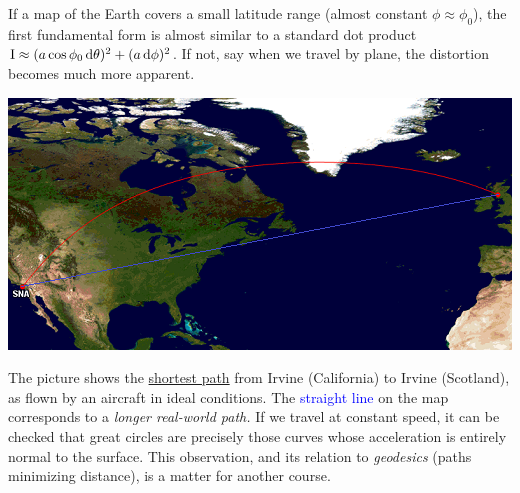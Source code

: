 \goodbreak


If a map of the Earth covers a small latitude range (almost constant $\phi\approx\phi_0$), the first fundamental form is almost similar to a standard dot product $\mathrm{I}\approx (a\cos\phi_0\,{\mathrm{d}\theta})^2+(a\,\mathrm{d}\phi)^2$. If not, say when we travel by plane, the distortion becomes much more apparent.
\begin{center}
	\includegraphics{fund-irvine.png}
\end{center}
The picture shows the \textcolor{red}{\href{http://www.gcmap.com/mapui?P=SNA-PIK}{shortest path}} from Irvine (California) to Irvine (Scotland), as flown by an aircraft in ideal conditions. The \textcolor{blue}{straight line} on the map corresponds to a \emph{longer real-world path.}\smallbreak
If we travel at constant speed, it can be checked that great circles are precisely those curves whose acceleration is entirely normal to the surface. This observation, and its relation to \emph{geodesics} (paths minimizing distance), is a matter for another course.


